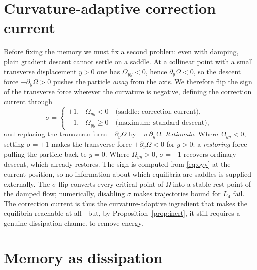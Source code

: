 \documentclass[10pt,twocolumn]{article}
\begin{document}
\section{Curvature-adaptive correction current}\label{sec:sigma}

Before fixing the memory we must fix a second problem: even with damping, plain
gradient descent cannot settle on a saddle. At a collinear point with a small
transverse displacement $y>0$ one has $\Omega_{yy}<0$, hence
$\partial_y\Omega<0$, so the descent force $-\partial_y\Omega>0$ pushes the
particle \emph{away} from the axis. We therefore flip the sign of the
transverse force wherever the curvature is negative, defining the correction
current through
\begin{equation}
  \sigma=
  \begin{cases}
    +1, & \Omega_{yy}<0 \quad\text{(saddle: correction current)},\\
    -1, & \Omega_{yy}\ge0 \quad\text{(maximum: standard descent)},
  \end{cases}
  \label{eq:sigma}
\end{equation}
and replacing the transverse force $-\partial_y\Omega$ by
$+\sigma\,\partial_y\Omega$. \emph{Rationale.} Where $\Omega_{yy}<0$, setting
$\sigma=+1$ makes the transverse force $+\partial_y\Omega<0$ for $y>0$: a
\emph{restoring} force pulling the particle back to $y=0$. Where
$\Omega_{yy}>0$, $\sigma=-1$ recovers ordinary descent, which already restores.
The sign is computed from \eqref{eq:oyy} at the current position, so no
information about which equilibria are saddles is supplied externally. The
$\sigma$-flip converts every critical point of $\Omega$ into a stable rest point
of the damped flow; numerically, disabling $\sigma$ makes trajectories bound for
$L_4$ fail. The correction current is thus the curvature-adaptive ingredient
that makes the equilibria reachable at all---but, by Proposition~\ref{prop:inert},
it still requires a genuine dissipation channel to remove energy.

\section{Memory as dissipation}\label{sec:memdiss}
\end{document}
